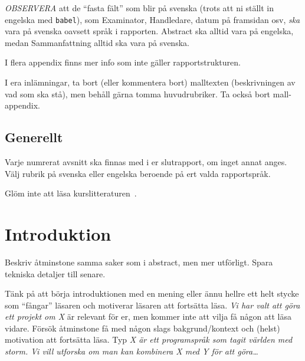 \documentclass[a4paper,12pt]{article}
\begin{document}
\emph{OBSERVERA} att de ``fasta fält'' som blir på svenska (trots att ni ställt in engelska med \texttt{babel}), som Examinator, Handledare, datum på framsidan osv, \emph{ska} vara på svenska oavsett språk i rapporten. Abstract ska alltid vara på engelska, medan Sammanfattning alltid ska vara på svenska.

I flera appendix finns mer info som inte gäller rapportstrukturen.

I era inlämningar, ta bort (eller kommentera bort) malltexten (beskrivningen av vad som ska stå), men behåll gärna tomma huvudrubriker. Ta också bort mall-appendix.

\subsection*{Generellt}
Varje numrerat avsnitt ska finnas med i er slutrapport, om inget annat anges.
Välj rubrik på svenska eller engelska beroende på ert valda rapportspråk.

Glöm inte att läsa kurslitteraturen~\cite{dawson:projects-in-computing,dawson:projects-in-computing-old}.



\fi
 \section{Introduktion}
 \iffalse Beskriv åtminstone samma saker som i abstract, men mer utförligt. Spara tekniska detaljer till senare.

 Tänk på att börja introduktionen med en mening eller ännu hellre ett helt stycke som ``fångar'' läsaren och motiverar läsaren att fortsätta läsa.  \emph{Vi har valt att göra ett projekt om X} är relevant för er, men kommer inte att vilja få någon att läsa vidare.  Försök åtminstone få med någon slags bakgrund/kontext och (helst) motivation att fortsätta läsa.  Typ \emph{X är ett programspråk som tagit världen med storm.  Vi vill utforska om man kan kombinera X med Y för att göra\ldots}
\end{document}
